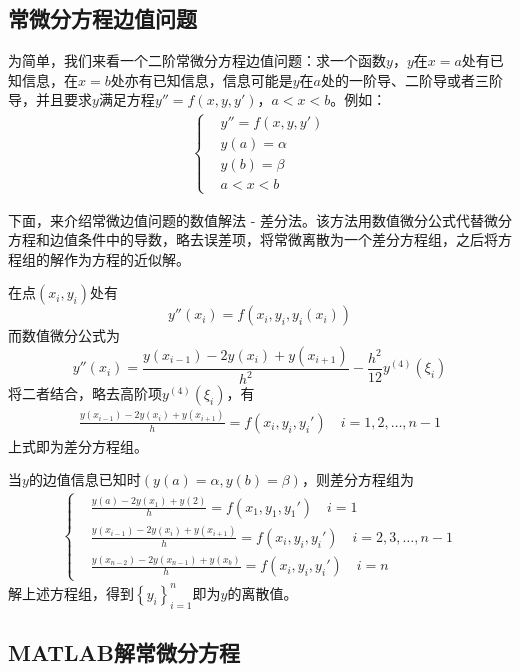 	\subsection{常微分方程边值问题}
		\par
		为简单，我们来看一个二阶常微分方程边值问题：求一个函数$y$，$y$在$x=a$处有已知信息，在$x=b$处亦有已知信息，信息可能是$y$在$a$处的一阶导、二阶导或者三阶导，并且要求$y$满足方程$y''=f(x,y,y')$，$a<x<b$。例如：
		\begin{align*}
			\left\{
				\begin{aligned}
					&y''=f(x,y,y')\\
					&y(a)=\alpha\\
					&y(b)=\beta\\
					&a<x<b
				\end{aligned}
			\right.
		\end{align*}
		\par
		下面，来介绍常微边值问题的数值解法 - 差分法。该方法用数值微分公式代替微分方程和边值条件中的导数，略去误差项，将常微离散为一个差分方程组，之后将方程组的解作为方程的近似解。
		\par
		在点$(x_i,y_i)$处有
		\[
			y''(x_i)=f(x_i,y_i,y_i(x_i))
		\]
		而数值微分公式为
		\[
			y''(x_i)=\frac{y(x_{i-1})-2y(x_i)+y(x_{i+1})}{h^2}-\frac{h^2}{12}y^{(4)}(\xi_i)
		\]
		将二者结合，略去高阶项$y^{(4)}(\xi_i)$，有
		\begin{align*}
		\frac{y(x_{i-1}) - 2y(x_i) + y(x_{i+1})}{h} = f(x_i,y_i,y_i') \quad i =1,2,\dots,n-1
		\end{align*}
		上式即为差分方程组。
		\par
		当$y$的边值信息已知时$(y(a)=\alpha,y(b)=\beta)$，则差分方程组为
		\begin{align*}
		\left\{
			\begin{aligned}
			&\frac{y(a) - 2y(x_1) + y(2)}{h} = f(x_1,y_1,y_1') \quad i =1\\
			&\frac{y(x_{i-1}) - 2y(x_i) + y(x_{i+1})}{h} = f(x_i,y_i,y_i') \quad i =2,3,\dots,n-1 \\
			&\frac{y(x_{n-2}) - 2y(x_{n-1}) + y(x_{b})}{h} = f(x_i,y_i,y_i') \quad i =n
			\end{aligned}
		\right.
		\end{align*}
		解上述方程组，得到$\left\{y_i\right\}_{i=1}^n$即为$y$的离散值。

	\subsection{MATLAB解常微分方程}
